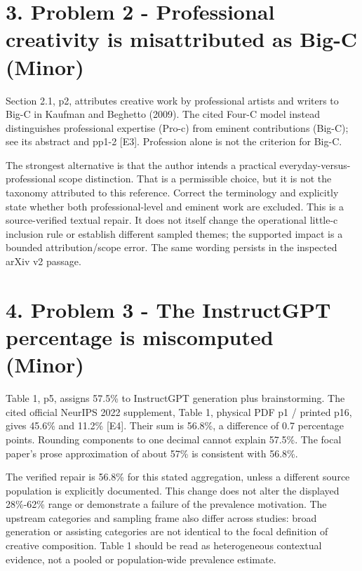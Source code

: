 \documentclass[10pt]{article}
\begin{document}
\section*{3. Problem 2 - Professional creativity is misattributed as Big-C (Minor)}
Section 2.1, p2, attributes creative work by professional artists and writers to Big-C in Kaufman and Beghetto (2009). The cited Four-C model instead distinguishes professional expertise (Pro-c) from eminent contributions (Big-C); see its abstract and pp1-2 [E3]. Profession alone is not the criterion for Big-C.\par
The strongest alternative is that the author intends a practical everyday-versus-professional scope distinction. That is a permissible choice, but it is not the taxonomy attributed to this reference. Correct the terminology and explicitly state whether both professional-level and eminent work are excluded. This is a source-verified textual repair. It does not itself change the operational little-c inclusion rule or establish different sampled themes; the supported impact is a bounded attribution/scope error. The same wording persists in the inspected arXiv v2 passage.\par
\section*{4. Problem 3 - The InstructGPT percentage is miscomputed (Minor)}
Table 1, p5, assigns 57.5\% to InstructGPT generation plus brainstorming. The cited official NeurIPS 2022 supplement, Table 1, physical PDF p1 / printed p16, gives 45.6\% and 11.2\% [E4]. Their sum is 56.8\%, a difference of 0.7 percentage points. Rounding components to one decimal cannot explain 57.5\%. The focal paper’s prose approximation of about 57\% is consistent with 56.8\%.\par
The verified repair is 56.8\% for this stated aggregation, unless a different source population is explicitly documented. This change does not alter the displayed 28\%-62\% range or demonstrate a failure of the prevalence motivation. The upstream categories and sampling frame also differ across studies: broad generation or assisting categories are not identical to the focal definition of creative composition. Table 1 should be read as heterogeneous contextual evidence, not a pooled or population-wide prevalence estimate.\par
\end{document}
